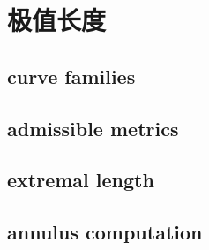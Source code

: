 \section{极值长度}
\label{b3:sec:0803}


\subsection{curve families}
\label{b3:subsec:080301}

\subsection{admissible metrics}
\label{b3:subsec:080302}

\subsection{extremal length}
\label{b3:subsec:080303}

\subsection{annulus computation}
\label{b3:subsec:080304}


